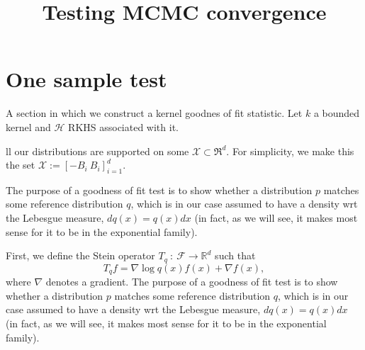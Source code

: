 \documentclass{article}
\title{Testing MCMC convergence}
\author{}
\date{}
\begin{document}
\maketitle


\section{One sample test}
A section in which we construct a kernel goodnes of fit statistic. Let $k$ a bounded kernel and $\mathcal{H}$  RKHS associated with it.


ll our distributions are supported on some $\mathcal{X}\subset\Re^{d}$.
For simplicity, we make this the set $\mathcal{X}:=[-B_{i}\: B_{i}]_{i=1}^{d}$.

The purpose of a goodness of fit test is to show whether a distribution
$p$ matches some reference distribution $q$, which is in our case
assumed to have a density wrt the Lebesgue measure, $dq(x)=q(x)dx$
(in fact, as we will see, it makes most sense for it to be in the
exponential family). 

First, we define the Stein operator $T_{q}\::\:\mathcal{F}\rightarrow\mathbb{R}^{d}$
such that
\[
T_{q}f=\nabla\log q(x)f(x)+\nabla f(x),
\]
where $\nabla$ denotes a gradient.
The purpose of a goodness of fit test is to show whether a distribution
$p$ matches some reference distribution $q$, which is in our case
assumed to have a density wrt the Lebesgue measure, $dq(x)=q(x)dx$
(in fact, as we will see, it makes most sense for it to be in the
exponential family). 
\end{document}
